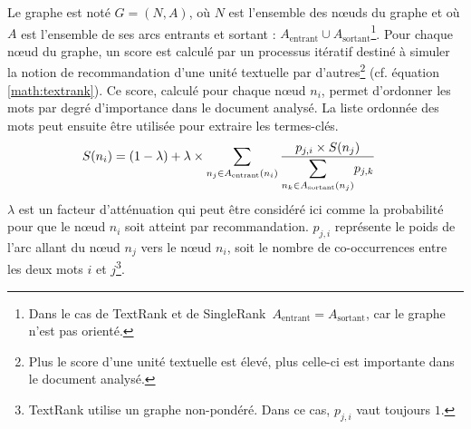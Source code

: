           Le graphe est noté $G = (N, A)$, où $N$ est l'ensemble des n\oe{}uds du
          graphe et où $A$ est l'ensemble de ses arcs entrants et sortant :
          $A_{\text{entrant}} \cup A_{\text{sortant}}$\footnote{Dans le cas de
          TextRank et de SingleRank\ $A_{\text{entrant}} = A_{\text{sortant}}$, car
          le graphe n'est pas orienté.}. Pour chaque n\oe{}ud du graphe, un score
          est calculé par un processus itératif destiné à simuler la notion de
          recommandation d'une unité textuelle par d'autres\footnote{Plus le score
          d'une unité textuelle est élevé, plus celle-ci est importante dans le
          document analysé.} (cf. équation \ref{math:textrank}). Ce score, calculé
          pour chaque n\oe{}ud $n_i$, permet d'ordonner les mots par degré
          d'importance dans le document analysé. La liste ordonnée des mots peut
          ensuite être utilisée pour extraire les termes-clés.
          \begin{align}
            S(n_i) &= (1 - \lambda) + \lambda \times \sum_{n_j \in A_{\text{entrant}}(n_i)} \frac{p_{j, i} \times S(n_j)}{\mathlarger{\sum}_{n_k \in A_{\text{sortant}}(n_j)} p_{j, k}} \label{math:textrank}
          \end{align}
          $\lambda$ est un facteur d'atténuation qui peut être considéré ici comme
          la probabilité pour que le n\oe{}ud $n_i$ soit atteint par recommandation.
          $p_{j, i}$ représente le poids de l'arc allant du n\oe{}ud $n_j$ vers le
          n\oe{}ud $n_i$, soit le nombre de co-occurrences entre les deux mots $i$
          et $j$\footnote{TextRank utilise un graphe non-pondéré. Dans ce cas,
          $p_{j, i}$ vaut toujours $1$.}.

